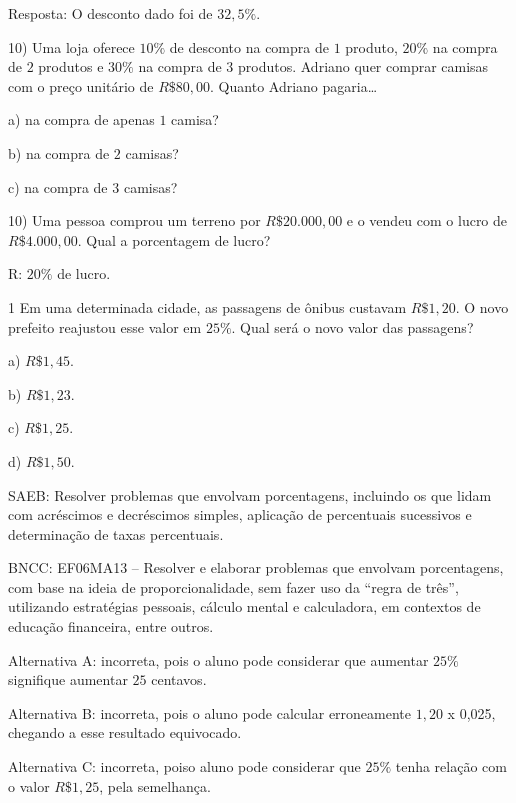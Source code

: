 Resposta: O desconto dado foi de $32,5\%$.

10) Uma loja oferece $10\%$ de desconto na compra de $1$ produto, $20\%$ na
compra de $2$ produtos e $30\%$ na compra de $3$ produtos. Adriano quer
comprar camisas com o preço unitário de $R\$80,00$. Quanto Adriano
pagaria\ldots{}

a) na compra de apenas $1$ camisa?

b) na compra de $2$ camisas?

c) na compra de $3$ camisas?





10) Uma pessoa comprou um terreno por $R\$20.000,00$ e o vendeu com o
lucro de $R\$4.000,00$. Qual a porcentagem de lucro?

R: $20\%$ de lucro.


\num{1}  Em uma determinada cidade, as passagens de ônibus custavam $R\$1,20$. O
novo prefeito reajustou esse valor em $25\%$. Qual será o novo valor das
passagens?

\begin{multicols}{2}\baselineskip 
a) $R\$1,45$.

b) $R\$1,23$.

c) $R\$1,25$.

d) $R\$1,50$.
\end{multicols}

SAEB: Resolver problemas que envolvam porcentagens, incluindo os que
lidam com acréscimos e decréscimos simples, aplicação de percentuais
sucessivos e determinação de taxas percentuais.

BNCC: EF06MA13 -- Resolver e elaborar problemas que envolvam
porcentagens, com base na ideia de proporcionalidade, sem fazer uso da
``regra de três'', utilizando estratégias pessoais, cálculo mental e
calculadora, em contextos de educação financeira, entre outros.

Alternativa A: incorreta, pois o aluno pode considerar que aumentar $25\%$
signifique aumentar $25$ centavos.

Alternativa B: incorreta, pois o aluno pode calcular erroneamente $1,20$ x
0,025, chegando a esse resultado equivocado.

Alternativa C: incorreta, poiso aluno pode considerar que $25\%$ tenha
relação com o valor $R\$1,25$, pela semelhança.

